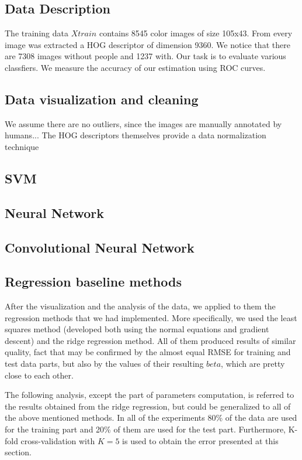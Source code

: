 \subsection{Data Description}
The training data $Xtrain$ contains 8545 color images of size  105x43. From every image 
was extracted a HOG descriptor of dimension 9360.
We notice that there are  7308 images without people and 1237 with. Our task is to evaluate various classfiers. We measure the accuracy of our estimation using ROC curves. 

\subsection{Data visualization and cleaning}
We assume there are no outliers, since the images 
are manually annotated by humans...
The HOG descriptors themselves provide a data normalization technique

\subsection{SVM}
\subsection{Neural Network}
\subsection{Convolutional Neural Network}

\subsection{Regression baseline methods}
After the visualization and the analysis of the data, we applied to them the regression methods that we had implemented. More specifically, we used the least squares method (developed both using the normal equations and gradient descent) and the ridge regression method. All of them produced results of similar quality, fact that may be confirmed by the almost equal RMSE for training and test data parts, but also by the values of their resulting $beta$, which are pretty close to each other.

The following analysis, except the part of parameters computation, is referred to the results obtained from the ridge regression, but could be generalized to all of the above mentioned methods. In all of the experiments 80\% of the data are used for the training part and 20\% of them are used for the test part. Furthermore, K-fold cross-validation  with $K=5$ is used to obtain the error presented at this section.

